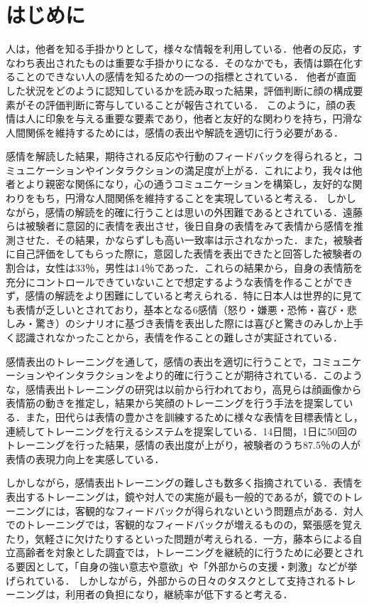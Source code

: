 \documentclass[titlepage]{jarticle}
\begin{document}
\section{{はじめに}}
人は，他者を知る手掛かりとして，様々な情報を利用している．他者の反応，すなわち表出されたものは重要な手掛かりになる．そのなかでも，表情は顕在化することのできない人の感情を知るための一つの指標とされている\cite{kaiser}．
他者が直面した状況をどのように認知しているかを読み取った結果，評価判断に顔の構成要素がその評価判断に寄与していることが報告されている\cite{kawabata}．
このように，顔の表情は人に印象を与える重要な要素であり，他者と友好的な関わりを持ち，円滑な人間関係を維持するためには，感情の表出や解読を適切に行う必要がある\cite{kino}．

感情を解読した結果，期待される反応や行動のフィードバックを得られると，コミュニケーションやインタラクションの満足度が上がる．これにより，我々は他者とより親密な関係になり，心の通うコミュニケーションを構築し，友好的な関わりをもち，円滑な人間関係を維持することを実現していると考える．
しかしながら，感情の解読を的確に行うことは思いの外困難であるとされている．遠藤らは被験者に意図的に表情を表出させ，後日自身の表情をみて表情から感情を推測させた．その結果，かならずしも高い一致率は示されなかった．また，被験者に自己評価をしてもらった際に，意図した表情を表出できたと回答した被験者の割合は，女性は33$％$，男性は14$％$であった．これらの結果から，自身の表情筋を充分にコントロールできていないことで想定するような表情を作ることができず，感情の解読をより困難にしていると考えられる\cite{endo}．特に日本人は世界的に見ても表情が乏しいとされており，基本となる6感情（怒り・嫌悪・恐怖・喜び・悲しみ・驚き）のシナリオに基づき表情を表出した際には喜びと驚きのみしか上手く認識されなかったことから，表情を作ることの難しさが実証されている\cite{sato}．

感情表出のトレーニングを通して，感情の表出を適切に行うことで，コミュニケーションやインタラクションをより的確に行うことが期待されている．このような，感情表出トレーニングの研究は以前から行われており，高見らは顔画像から表情筋の動きを推定し，結果から笑顔のトレーニングを行う手法を提案している\cite{takami}．また，田代らは表情の豊かさを訓練するために様々な表情を目標表情とし，連続してトレーニングを行えるシステムを提案している．14日間，1日に50回のトレーニングを行った結果，感情の表出度が上がり，被験者のうち87.5$％$の人が表情の表現力向上を実感している\cite{tashiro}．

しかしながら，感情表出トレーニングの難しさも数多く指摘されている．表情を表出するトレーニングは，鏡や対人での実施が最も一般的であるが，鏡でのトレーニングには，客観的なフィードバックが得られないという問題点がある．対人でのトレーニングでは，客観的なフィードバックが増えるものの，緊張感を覚えたり，気軽さに欠けたりするといった問題が考えられる．一方，藤本らによる自立高齢者を対象とした調査では，トレーニングを継続的に行うために必要とされる要因として，「自身の強い意志や意欲」や「外部からの支援・刺激」などが挙げられている\cite{fujimoto}．
しかしながら，外部からの日々のタスクとして支持されるトレーニングは，利用者の負担になり，継続率が低下すると考える．
\end{document}
